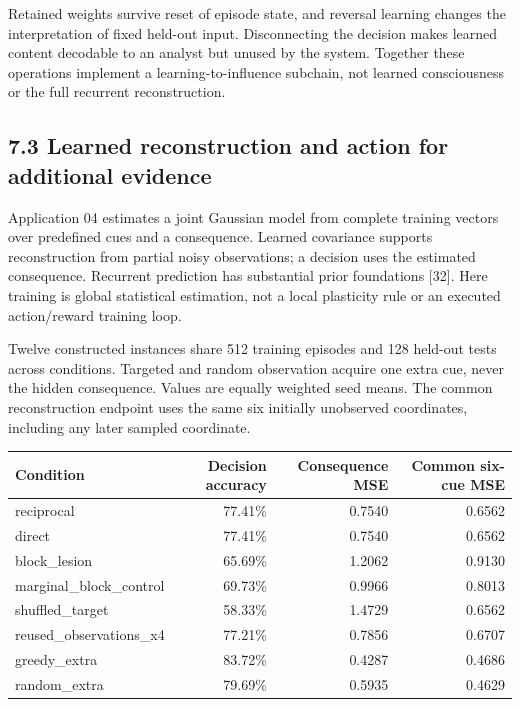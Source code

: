 \documentclass[
  american,
  11pt,
  letterpaper,
]{article}
\newcounter{none} %
\begin{document}
Retained weights survive reset of episode state, and reversal learning changes the interpretation of fixed held-out input. Disconnecting the decision makes learned content decodable to an analyst but unused by the system. Together these operations implement a learning-to-influence subchain, not learned consciousness or the full recurrent reconstruction.

\subsection{7.3 Learned reconstruction and action for additional evidence}\label{learned-reconstruction-and-action-for-additional-evidence}

Application 04 estimates a joint Gaussian model from complete training vectors over predefined cues and a consequence. Learned covariance supports reconstruction from partial noisy observations; a decision uses the estimated consequence. Recurrent prediction has substantial prior foundations {[}32{]}. Here training is global statistical estimation, not a local plasticity rule or an executed action/reward training loop.

Twelve constructed instances share 512 training episodes and 128 held-out tests across conditions. Targeted and random observation acquire one extra cue, never the hidden consequence. Values are equally weighted seed means. The common reconstruction endpoint uses the same six initially unobserved coordinates, including any later sampled coordinate.

{\def\LTcaptype{none} %
\begin{longtable}[]{@{}lrrr@{}}
\toprule\noalign{}
Condition & Decision accuracy & Consequence MSE & Common six-cue MSE \\
\midrule\noalign{}
\endhead
\bottomrule\noalign{}
\endlastfoot
reciprocal & 77.41\% & 0.7540 & 0.6562 \\
direct & 77.41\% & 0.7540 & 0.6562 \\
block\_lesion & 65.69\% & 1.2062 & 0.9130 \\
marginal\_block\_control & 69.73\% & 0.9966 & 0.8013 \\
shuffled\_target & 58.33\% & 1.4729 & 0.6562 \\
reused\_observations\_x4 & 77.21\% & 0.7856 & 0.6707 \\
greedy\_extra & 83.72\% & 0.4287 & 0.4686 \\
random\_extra & 79.69\% & 0.5935 & 0.4629 \\
\end{longtable}
}
\end{document}
